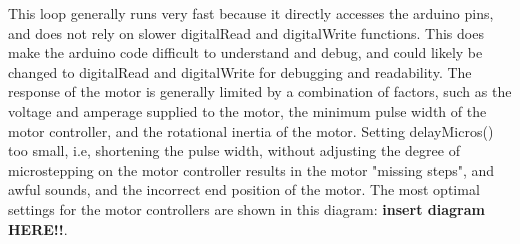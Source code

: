\documentclass{article}
\begin{document}
This loop generally runs very fast because it directly accesses the arduino pins, and does not rely on slower digitalRead and digitalWrite functions. This does make the arduino code difficult to understand and debug, and could likely be changed to digitalRead and digitalWrite for debugging and readability. The response of the motor is generally limited by a combination of factors, such as the voltage and amperage supplied to the motor, the minimum pulse width of the motor controller, and the rotational inertia of the motor. Setting delayMicros() too small, i.e, shortening the pulse width, without adjusting the degree of microstepping on the motor controller results in the motor "missing steps", and awful sounds, and the incorrect end position of the motor. The most optimal settings for the motor controllers are shown in this diagram: \textbf{insert diagram HERE!!}.
\end{document}
